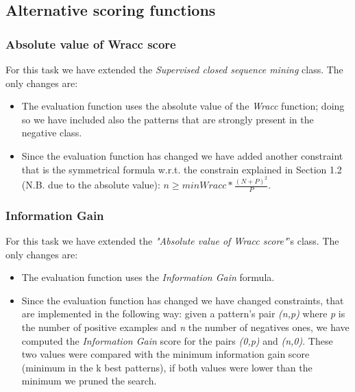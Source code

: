\documentclass[10pt, a4paper]{article}
\begin{document}
	\subsection{Alternative scoring functions}	
	\subsubsection{Absolute value of Wracc score}	
	For this task we have extended the \textit{Supervised closed sequence mining} class. The only changes are:
	\begin{itemize}
		\item The evaluation function uses the absolute value of the \textit{Wracc} function; doing so we have included also the patterns that are strongly present in the negative class.
		\item Since the evaluation function has changed we have added another constraint that is the symmetrical formula w.r.t. the constrain explained in Section 1.2 (N.B. due to the absolute value): \newline $n\geq minWracc*\frac{(N+P)^2}{P}$.
	\end{itemize}

	\subsubsection{Information Gain}
	For this task we have extended the \textit{"Absolute value of Wracc score"}'s class. The only changes are:
	\begin{itemize}
		\item The evaluation function uses the \textit{Information Gain} formula.
		\item Since the evaluation function has changed we have changed constraints, that are implemented in the following way: given a pattern's pair \textit{(n,p)} where \textit{p} is the number of positive examples and \textit{n} the number of negatives ones, we have computed the \textit{Information Gain} score for the pairs \textit{(0,p)} and \textit{(n,0)}. These two values were compared with the minimum information gain score (minimum in the k best patterns), if both values were lower than the minimum we pruned the search.	
	\end{itemize}
\end{document}
